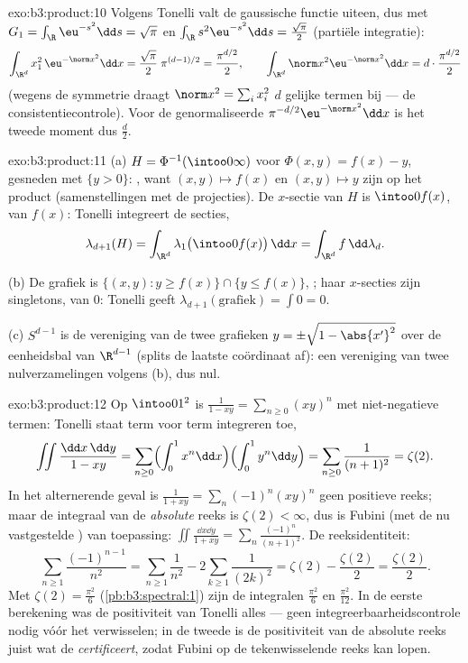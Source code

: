 \begin{solution}{exo:b3:product:10}
Volgens Tonelli valt de gaussische functie uiteen, dus met $G_1 =
\int_\R\eu^{-s^2}\dd s = \sqrt\pi$ en $\int_\R s^2\eu^{-s^2}\dd s
= \frac{\sqrt\pi}2$ (partiële integratie):
\[
\int_{\R^d}x_1^2\,\eu^{-\norm x^2}\dd x =
\frac{\sqrt\pi}2\;\pi^{(d-1)/2} = \frac{\pi^{d/2}}2,
\qquad
\int_{\R^d}\norm x^2\eu^{-\norm x^2}\dd x =
d\cdot\frac{\pi^{d/2}}2
\]
(wegens de symmetrie draagt $\norm x^2 = \sum_ix_i^2$ $d$ gelijke
termen bij --- de consistentiecontrole). Voor de genormaliseerde
 $\pi^{-d/2}\eu^{-\norm x^2}\dd x$ is het tweede moment dus
$\frac d2$.
\end{solution}

\begin{solution}{exo:b3:product:11}
(a) $H = \Phi^{-1}(\intoo0\infty)$ voor $\Phi(x, y) = f(x) - y$,
gesneden met $\{y > 0\}$: , want $(x, y) \mapsto f(x)$ en
$(x,y)\mapsto y$ zijn  op het product (samenstellingen met
de projecties). De $x$-sectie van $H$ is $\intoo0{f(x)}$, van 
$f(x)$: Tonelli integreert de secties,
\[
\lambda_{d+1}(H) = \int_{\R^d}\lambda_1\bigl(\intoo0{f(x)}
\bigr)\,\dd x = \int_{\R^d}f\,\dd\lambda_d .
\]

(b) De grafiek is $\{(x,y) : y \geq f(x)\} \cap \{y \leq f(x)\}$,
; haar $x$-secties zijn singletons, van  $0$: Tonelli
geeft $\lambda_{d+1}(\text{grafiek}) = \int 0 = 0$.

(c) $S^{d-1}$ is de vereniging van de twee grafieken $y = \pm\sqrt{1
- \abs{x'}^2}$ over de eenheidsbal van $\R^{d-1}$ (splits de
laatste coördinaat af): een vereniging van twee nulverzamelingen
volgens (b), dus nul.
\end{solution}

\begin{solution}{exo:b3:product:12}
Op $\intoo01^2$ is $\frac1{1 - xy} = \sum_{n\geq0}(xy)^n$ met
niet-negatieve termen: Tonelli staat term voor term integreren
toe,
\[
\iint\frac{\dd x\,\dd y}{1 - xy}
= \sum_{n\geq0}\Bigl(\int_0^1x^n\dd x\Bigr)
\Bigl(\int_0^1y^n\dd y\Bigr)
= \sum_{n\geq0}\frac1{(n+1)^2} = \zeta(2) .
\]
In het alternerende geval is $\frac1{1 + xy} =
\sum_n(-1)^n(xy)^n$ geen positieve reeks; maar de integraal van
de \emph{absolute} reeks is $\zeta(2) < \infty$, dus is Fubini
(met de nu vastgestelde ) van toepassing:
$\iint\frac{\dd x\dd y}{1 + xy} = \sum_n\frac{(-1)^n}{(n+1)^2}$.
De reeksidentiteit:
\[
\sum_{n\geq1}\frac{(-1)^{n-1}}{n^2}
= \sum_{n\geq1}\frac1{n^2} - 2\sum_{k\geq1}\frac1{(2k)^2}
= \zeta(2) - \frac{\zeta(2)}2 = \frac{\zeta(2)}2 .
\]
Met $\zeta(2) = \frac{\pi^2}6$ (\cref{pb:b3:spectral:1}) zijn de
integralen $\frac{\pi^2}6$ en $\frac{\pi^2}{12}$. In de eerste
berekening was de positiviteit van Tonelli alles --- geen
integreerbaarheidscontrole nodig vóór het verwisselen; in de
tweede is de positiviteit van de absolute reeks juist wat de
 \emph{certificeert}, zodat Fubini op de
tekenwisselende reeks kan lopen.
\end{solution}


